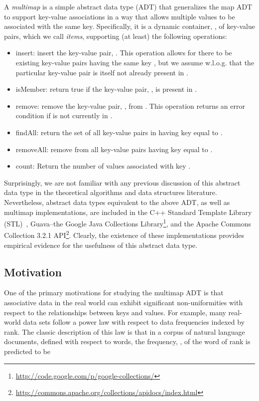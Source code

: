 \documentclass[11pt,letterpaper]{article}
\begin{document}
A \emph{multimap} is a simple abstract data type (ADT) that generalizes the 
map ADT to support key-value associations in a way that allows
multiple values to be associated with the same key.
Specifically, it is a dynamic container, , of key-value
pairs, which we call \emph{items}, 
supporting (at least) the following operations:
\begin{itemize}
\item
insert: insert the key-value pair, . This operation
allows for there to be existing key-value pairs having the same
key , but we assume w.l.o.g. that the particular key-value pair
 is itself not already present in .
\item
isMember: return true if the key-value pair, , is
present in .
\item
remove: remove the key-value pair, , from .
This operation
returns an error condition if  is not currently in .
\item
findAll: return the set of all key-value pairs
in  having key equal to .
\item
removeAll: remove from  all key-value pairs
having key equal to .
\item
count: Return the number of values associated with key .
\end{itemize}

Surprisingly, we are not familiar with any previous discussion of this
abstract data type in the theoretical algorithms and data structures
literature.  Nevertheless, abstract data types equivalent to the above
ADT, as well as multimap implementations, are included in the C++
Standard Template Library (STL)~\cite{ms-tstrc-95}, Guava--the Google Java
Collections 
Library\footnote{\url{http://code.google.com/p/google-collections/}}, 
and the Apache Commons Collection 3.2.1 
API\footnote{\url{http://commons.apache.org/collections/apidocs/index.html}}.  
Clearly, the existence of these implementations provides
empirical evidence for the usefulness of this abstract data type.

\subsection{Motivation}
\label{sec:motivation}
One of the primary motivations for studying the multimap ADT is that
associative data in the real world can exhibit significant
non-uniformities with respect to the relationships between keys and
values.  For example, many real-world data sets follow 
a power law with respect to data frequencies indexed by rank.
The classic description of this law is that in a corpus of
natural language documents, defined with respect to  words,
the frequency, , of the word of rank  is predicted to be
\end{document}
